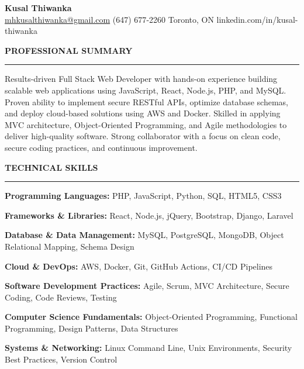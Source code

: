 \documentclass[10pt,letterpaper]{article}
\begin{document}
\begin{center}
{\LARGE\textbf{Kusal Thiwanka}}\\[3pt]
\href{mailto:mhkusalthiwanka@gmail.com}{mhkusalthiwanka@gmail.com}\hspace{2em}%
(647) 677{-}2260\hspace{2em}%
Toronto, ON\hspace{2em}
linkedin.com/in/kusal-thiwanka
\end{center}

\vspace{6pt}

\textbf{PROFESSIONAL SUMMARY}\\[-8pt]
\noindent\rule{\textwidth}{1pt}

\vspace{-2pt}

Results-driven Full Stack Web Developer with hands-on experience building scalable web applications using JavaScript, React, Node.js, PHP, and MySQL. Proven ability to implement secure RESTful APIs, optimize database schemas, and deploy cloud-based solutions using AWS and Docker. Skilled in applying MVC architecture, Object-Oriented Programming, and Agile methodologies to deliver high-quality software. Strong collaborator with a focus on clean code, secure coding practices, and continuous improvement.

\vspace{8pt}

\textbf{TECHNICAL SKILLS}\\[-8pt]
\noindent\rule{\textwidth}{1pt}

\vspace{-2pt}

\textbf{Programming Languages:} PHP, JavaScript, Python, SQL, HTML5, CSS3

\textbf{Frameworks \& Libraries:} React, Node.js, jQuery, Bootstrap, Django, Laravel

\textbf{Database \& Data Management:} MySQL, PostgreSQL, MongoDB, Object Relational Mapping, Schema Design

\textbf{Cloud \& DevOps:} AWS, Docker, Git, GitHub Actions, CI/CD Pipelines

\textbf{Software Development Practices:} Agile, Scrum, MVC Architecture, Secure Coding, Code Reviews, Testing

\textbf{Computer Science Fundamentals:} Object-Oriented Programming, Functional Programming, Design Patterns, Data Structures

\textbf{Systems \& Networking:} Linux Command Line, Unix Environments, Security Best Practices, Version Control
\end{document}
